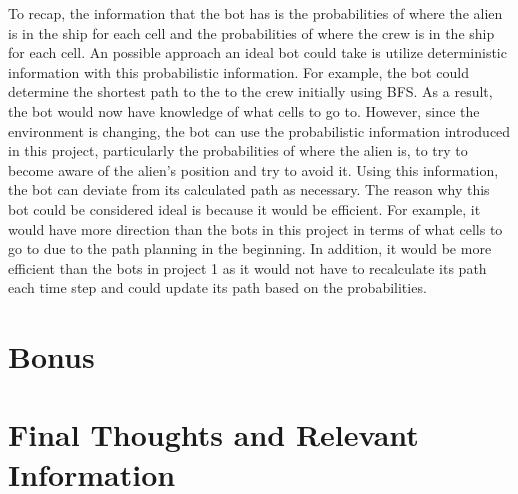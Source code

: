 \documentclass[11pt]{article}
\begin{document}
To recap, the information that the bot has is the probabilities of where the alien is in the ship for each cell and the probabilities of where the crew is in the ship for each cell. An possible approach an ideal bot could take is utilize deterministic information with this probabilistic information. For example, the bot could determine the shortest path to the to the crew initially using BFS. As a result, the bot would now have knowledge of what cells to go to. However, since the environment is changing, the bot can use the probabilistic information introduced in this project, particularly the probabilities of where the alien is, to try to become aware of the alien's position and try to avoid it. Using this information, the bot can deviate from its calculated path as necessary. The reason why this bot could be considered ideal is because it would be efficient. For example, it would have more direction than the bots in this project in terms of what cells to go to due to the path planning in the beginning. In addition, it would be more efficient than the bots in project 1 as it would not have to recalculate its path each time step and could update its path based on the probabilities. 

\section{Bonus}



\section{Final Thoughts and Relevant Information}
\end{document}
